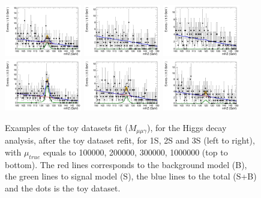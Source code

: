 \begin{figure}[!htbp]
\begin{center}
\includegraphics[width=0.3\textwidth]{figures_and_tables/modeling_xchecks/plots/HToUpsilon1SPhoton_Cat0_signalStrenght_300000/Cat0_mHZ_fit_s}
\includegraphics[width=0.3\textwidth]{figures_and_tables/modeling_xchecks/plots/HToUpsilon2SPhoton_Cat0_signalStrenght_300000/Cat0_mHZ_fit_s}
\includegraphics[width=0.3\textwidth]{figures_and_tables/modeling_xchecks/plots/HToUpsilon3SPhoton_Cat0_signalStrenght_300000/Cat0_mHZ_fit_s}
\includegraphics[width=0.3\textwidth]{figures_and_tables/modeling_xchecks/plots/HToUpsilon1SPhoton_Cat0_signalStrenght_1000000/Cat0_mHZ_fit_s}
\includegraphics[width=0.3\textwidth]{figures_and_tables/modeling_xchecks/plots/HToUpsilon2SPhoton_Cat0_signalStrenght_1000000/Cat0_mHZ_fit_s}
\includegraphics[width=0.3\textwidth]{figures_and_tables/modeling_xchecks/plots/HToUpsilon3SPhoton_Cat0_signalStrenght_1000000/Cat0_mHZ_fit_s}
\end{center}
\caption{Examples of the toy datasets fit ($M_{\mu\mu\gamma}$), for the Higgs decay analysis, after the toy dataset refit, for 1S, 2S and 3S (left to right), with $\mu_{true}$ equals to 100000, 200000, 300000, 1000000 (top to bottom). The red lines corresponds to the background model (B), the green lines to signal model (S), the blue lines to the total (S+B) and the dots is the toy dataset.}
\label{fig:fits_xchecks_mHZ_H}
\end{figure}
